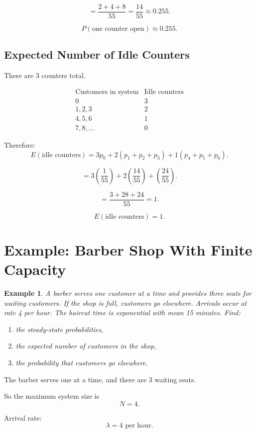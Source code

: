\documentclass[12pt]{article}
\newtheorem{example}{Example}
\begin{document}
\[
=\frac{2+4+8}{55}
=\frac{14}{55}
\approx 0.255.
\]

\[
\boxed{P(\text{one counter open})\approx 0.255.}
\]

\subsection*{Expected Number of Idle Counters}

There are 3 counters total.

\[
\begin{array}{c|c}
\text{Customers in system} & \text{Idle counters}\\
\hline
0 & 3\\
1,2,3 & 2\\
4,5,6 & 1\\
7,8,\ldots & 0
\end{array}
\]

Therefore:
\[
E(\text{idle counters})
=
3p_0+2(p_1+p_2+p_3)+1(p_4+p_5+p_6).
\]

\[
=
3\left(\frac1{55}\right)
+2\left(\frac{14}{55}\right)
+\left(\frac{24}{55}\right).
\]

\[
=\frac{3+28+24}{55}=1.
\]

\[
\boxed{E(\text{idle counters})=1.}
\]

\section{Example: Barber Shop With Finite Capacity}

\begin{example}
A barber serves one customer at a time and provides three seats for waiting customers. If the shop is full, customers go elsewhere. Arrivals occur at rate 4 per hour. The haircut time is exponential with mean 15 minutes. Find:

\begin{enumerate}[label=(\alph*)]
    \item the steady-state probabilities,
    \item the expected number of customers in the shop,
    \item the probability that customers go elsewhere.
\end{enumerate}
\end{example}

The barber serves one at a time, and there are 3 waiting seats.

So the maximum system size is
\[
N=4.
\]

Arrival rate:
\[
\lambda=4\text{ per hour}.
\]
\end{document}
